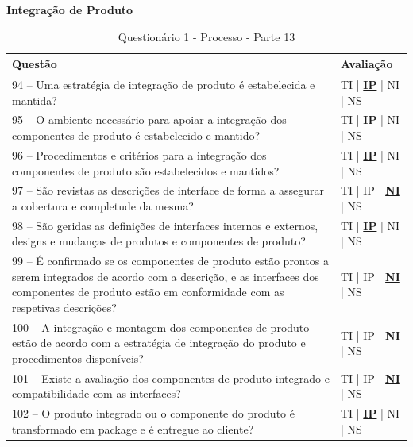 \documentclass[openany,10pt,a4paper]{article}
\begin{document}
\begin{appendix}
	\begin{table}[h]
	\textbf{Integração de Produto}
		\centering
		\caption{Questionário 1 - Processo - Parte 13}
		\begin{tabular}{|p{5in}p{1in}|}		
			\hline
			\textbf{Questão}  & \textbf{Avaliação}\\ 
			\hline
			94 – Uma estratégia de integração de produto é estabelecida e mantida?
	 & TI | \underline{\textbf{IP}} | NI | NS \\
			\hline
			95 – O ambiente necessário para apoiar a integração dos componentes de produto é 
	estabelecido e mantido?
	 & TI | \underline{\textbf{IP}} | NI | NS \\
			\hline
			96 – Procedimentos e critérios para a integração dos componentes de produto são estabelecidos 
	e mantidos?
	 & TI | \underline{\textbf{IP}} | NI | NS \\
			\hline
			97 – São revistas as descrições de interface de forma a assegurar a cobertura e completude da 
	mesma?
	 & TI | IP | \underline{\textbf{NI}} | NS \\
			\hline
			98 – São geridas as definições de interfaces internos e externos, designs e mudanças de produtos 
	e componentes de produto?
	  & TI | \underline{\textbf{IP}} | NI | NS \\
			\hline
			99 – É confirmado se os componentes de produto estão prontos a serem integrados de acordo 
	com a descrição, e as interfaces dos componentes de produto estão em conformidade com as
	respetivas descrições? 
	 & TI | IP | \underline{\textbf{NI}} | NS \\
	 \hline
			100 – A integração e montagem dos componentes de produto estão de acordo com a estratégia
	de integração do produto e procedimentos disponíveis? 
	 & TI | IP | \underline{\textbf{NI}} | NS \\
	 \hline
			101 – Existe a avaliação dos componentes de produto integrado e compatibilidade com as
	interfaces? 
	 & TI | IP | \underline{\textbf{NI}} | NS \\
	 \hline
			102 – O produto integrado ou o componente do produto é transformado em package e é
	entregue ao cliente? 
	 & TI | \underline{\textbf{IP}} | NI | NS \\
			\hline
		\end{tabular} 
	\end{table}
	

\end{appendix}
\end{document}
